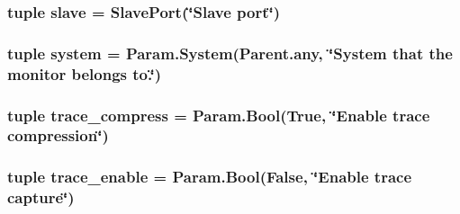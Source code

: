 \label{classCommMonitor_1_1CommMonitor_a9b4d8317f49b4e999d971254f1eeebf6}
\hypertarget{classCommMonitor_1_1CommMonitor_a9b8cb1f697e86858437a78f041478c9b}{
\subsubsection[{slave}]{\setlength{\rightskip}{0pt plus 5cm}tuple {\bf slave} = {\bf SlavePort}(\char`\"{}Slave port\char`\"{})}}
\label{classCommMonitor_1_1CommMonitor_a9b8cb1f697e86858437a78f041478c9b}
\hypertarget{classCommMonitor_1_1CommMonitor_ab737471139f5a296e5b26e8a0e1b0744}{
\subsubsection[{system}]{\setlength{\rightskip}{0pt plus 5cm}tuple {\bf system} = Param.System(Parent.any, \char`\"{}System that the monitor belongs to.\char`\"{})}}
\label{classCommMonitor_1_1CommMonitor_ab737471139f5a296e5b26e8a0e1b0744}
\hypertarget{classCommMonitor_1_1CommMonitor_a4e22e4bcba92e8cd852e6de3f5a5c296}{
\subsubsection[{trace\_\-compress}]{\setlength{\rightskip}{0pt plus 5cm}tuple {\bf trace\_\-compress} = Param.Bool(True, \char`\"{}Enable trace compression\char`\"{})}}
\label{classCommMonitor_1_1CommMonitor_a4e22e4bcba92e8cd852e6de3f5a5c296}
\hypertarget{classCommMonitor_1_1CommMonitor_af3f3a502736f254f40a526b6f9e4ecff}{
\subsubsection[{trace\_\-enable}]{\setlength{\rightskip}{0pt plus 5cm}tuple {\bf trace\_\-enable} = Param.Bool(False, \char`\"{}Enable trace capture\char`\"{})}}
